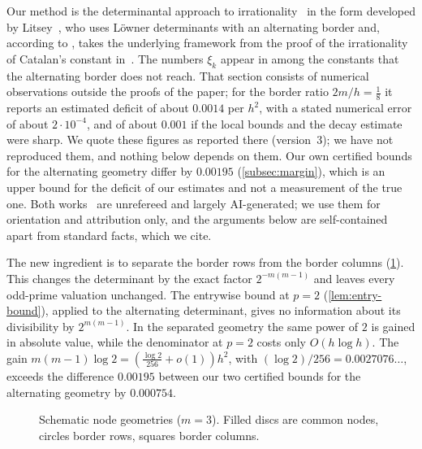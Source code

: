 Our method is the determinantal approach to irrationality~\cite{Zudilin2017} in the form
developed by Litsey~\cite{Litsey2026Lowner}, who uses L\"owner determinants with an alternating
border and, according to \cite[\S1.2]{Litsey2026Lowner}, takes the underlying framework from the
proof of the irrationality of Catalan's constant in~\cite{OpenAICatalan2026}. The numbers $\xi_k$
appear in \cite[\S12.1]{Litsey2026Lowner} among the constants that the alternating border does
not reach. That section consists of numerical observations outside the proofs of the paper; for
the border ratio $2m/h=\frac18$ it reports an estimated deficit of about $0.0014$ per $h^2$, with
a stated numerical error of about $2\cdot10^{-4}$, and of about $0.001$ if the local bounds and
the decay estimate were sharp. We quote these figures as reported there (version~3); we have not
reproduced them, and nothing below depends on them. Our own certified bounds for the alternating
geometry differ by $0.00195$ (\cref{subsec:margin}), which is an upper bound for the deficit of our
estimates and not a measurement of the true one. Both
works~\cite{Litsey2026Lowner,OpenAICatalan2026} are unrefereed and largely AI-generated; we use
them for orientation and attribution only, and the arguments below are self-contained apart from
standard facts, which we cite.

The new ingredient is to separate the border rows from the border columns
(\cref{fig:geometries}). This changes the determinant by the exact factor $2^{-m(m-1)}$ and
leaves every odd-prime valuation unchanged. The entrywise bound at $p=2$
(\cref{lem:entry-bound}), applied to the alternating determinant, gives no information about its
divisibility by $2^{m(m-1)}$. In the
separated geometry the same power of $2$ is gained in absolute value, while the denominator at
$p=2$ costs only $O(h\log h)$. The gain $m(m-1)\log2=(\frac{\log2}{256}+o(1))h^2$, with
$(\log2)/256=0.0027076\ldots$, exceeds the difference $0.00195$ between our two certified bounds
for the alternating geometry by $0.000754$.

\begin{figure}[ht]
\centering
{}
\caption{Schematic node geometries ($m=3$). Filled discs are common nodes, circles border rows,
squares border columns.}
\label{fig:geometries}
\end{figure}

